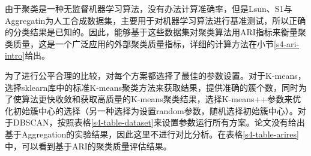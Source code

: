 由于聚类是一种无监督机器学习算法，没有办法计算准确率，但是Lsun、S1与Aggregatin为人工合成数据集，主要用于对机器学习算法进行基准测试，所以正确的分类结果是已知的。因此，能够基于这些数据集对聚类算法用ARI指标来衡量聚类质量，这是一个广泛应用的外部聚类质量指标\cite{vinh2009information,arbelaitz2013extensive}，详细的计算方法在小节\ref{s4-ari-intro}给出。
\begin{table}[htbp]
	\centering
	\renewcommand{\arraystretch}{1.3}
	\caption{聚类质量评估}
	\label{s4-table-arires}
\end{table}

为了进行公平合理的比较，对每个方案都选择了最佳的参数设置。对于K-means，选择sklearn库中的标准K-means聚类方法来获取结果\cite{buitinck2013api}，提供准确的簇个数，同时为了使算法更快收敛和获取高质量的K-means聚类结果，选择K-means++参数来优化初始簇中心的选择（另一种选择为设置random参数，随机选择初始簇中心）。对于DBSCAN，按照表格\ref{s4-table-dataset}来设置参数运行所有方案。论文\cite{bozdemir2021privacy}没有给出基于Aggregation的实验结果，因此这里不进行对比分析。在表格\ref{s4-table-arires}中，可以看到基于ARI的聚类质量评估结果。

